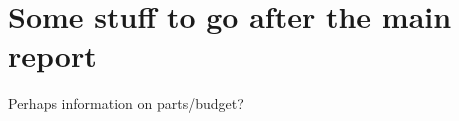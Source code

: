 
\chapter{Some stuff to go after the main report}
\label{appendix/a}

Perhaps information on parts/budget?
